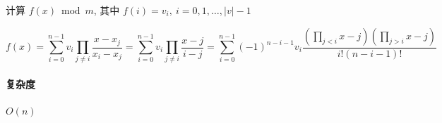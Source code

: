 计算 \(f(x) \bmod m\), 其中 \(f(i) = v_i,~i = 0,1,\dots,|v|-1\)

\[
    f(x) =\sum_{i=0}^{n-1} v_i \prod_{j\ne i} \frac{x-x_j}{x_i-x_j}   =\sum_{i=0}^{n-1} v_i \prod_{j\ne i} \frac{x-j}{i-j} =\sum_{i=0}^{n-1} (-1)^{n-i-1} v_i \frac{(\prod_{j<i} x-j)(\prod_{j>i} x-j)}{i!(n-i-1)!}
\]

\paragraph{复杂度} \(O(n)\)

